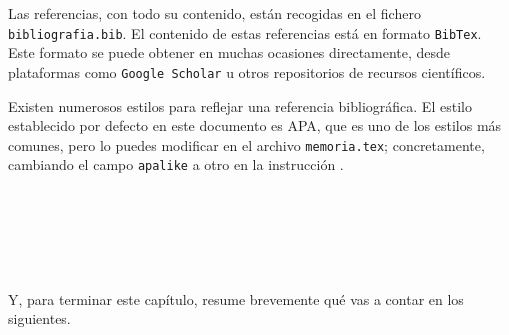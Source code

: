 Las referencias, con todo su contenido, están recogidas en el fichero \texttt{bibliografia.bib}. El contenido de estas referencias está en formato \texttt{BibTex}. Este formato se puede obtener en muchas ocasiones directamente, desde plataformas como \texttt{Google Scholar} u otros repositorios de recursos científicos.

Existen numerosos estilos para reflejar una referencia bibliográfica. El estilo establecido por defecto en este documento es APA, que es uno de los estilos más comunes, pero lo puedes modificar en el archivo \texttt{memoria.tex}; concretamente, cambiando el campo \verb|apalike| a otro en la instrucción \verb||. 

\

\

\

Y, para terminar este capítulo, resume brevemente qué vas a contar en los siguientes.
